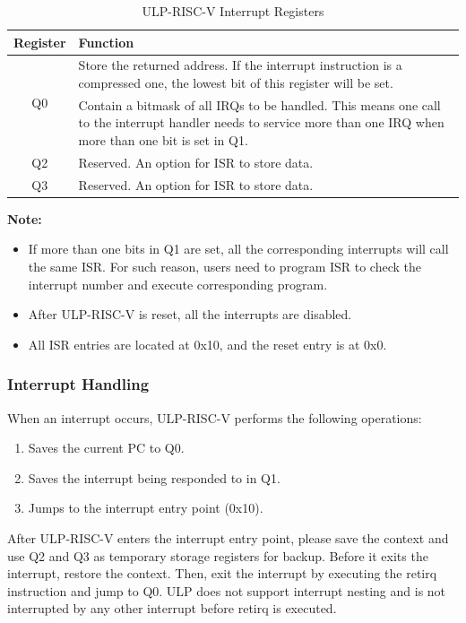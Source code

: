 \documentclass[main\_\_EN.tex]{subfiles}
\begin{document}
\begin{table}[H]
    \centering
    \begin{tabular}{ c p{9.0cm} }
    \textbf{Register} & \textbf{Function} \\ \hline
     \multirow{2}{*}{Q0} & Store the returned address. If the interrupt instruction is a compressed one, the lowest bit of this register will be set.\\
    \multirow{2}{*}{Q1} & Contain a bitmask of all IRQs to be handled. This means one call to the interrupt handler needs to service more than one IRQ when more than one bit is set in Q1.\\
    Q2 &  Reserved. An option for ISR to store data.\\
    Q3 & Reserved. An option for ISR to store data.\\
    \end{tabular}
    \caption{ULP-RISC-V Interrupt Registers}
    \label{tab:PicoRV32-interrupt-registers}
\end{table}

\vspace{-2em}
\textbf{Note:}
\begin{itemize}
    \item If more than one bits in Q1 are set, all the corresponding interrupts will call the same ISR. For such reason, users need to program ISR to check the interrupt number and execute corresponding program.
    \item After ULP-RISC-V is reset, all the interrupts are disabled.
    \item All ISR entries are located at 0x{}10, and the reset entry is at 0x{}0.
\end{itemize}


\subsubsection{Interrupt Handling}

When an interrupt occurs, ULP-RISC-V performs the following operations:

\begin{enumerate}
    \item Saves the current PC to Q0.
    \item Saves the interrupt being responded to in Q1.
    \item Jumps to the interrupt entry point (0x{}10).
\end{enumerate}

After ULP-RISC-V enters the interrupt entry point, please save the context and use Q2 and Q3 as temporary storage registers for backup. Before it exits the interrupt, restore the context. Then, exit the interrupt by executing the retirq instruction and jump to Q0. ULP does not support interrupt nesting and is not interrupted by any other interrupt before retirq is executed.
\end{document}

